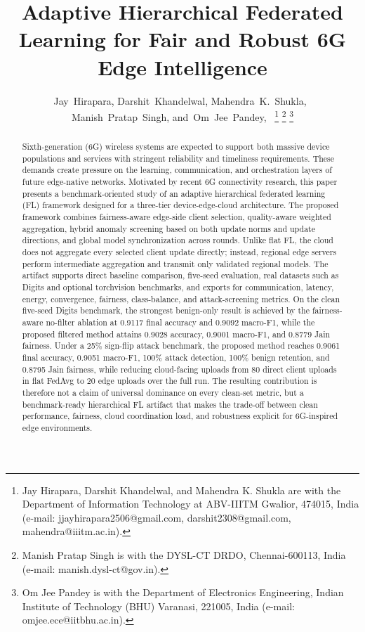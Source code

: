 \documentclass[conference]{IEEEtran}
\begin{document}
\title{Adaptive Hierarchical Federated Learning for Fair and Robust 6G Edge Intelligence}

\author{Jay~Hirapara,
        Darshit~Khandelwal,
        Mahendra~K.~Shukla,~
        Manish~Pratap~Singh,
        and~Om~Jee~Pandey,~%
\thanks{Jay Hirapara, Darshit Khandelwal, and Mahendra K. Shukla are with the Department of Information Technology at ABV-IIITM Gwalior, 474015, India (e-mail: jjayhirapara2506@gmail.com, darshit2308@gmail.com, mahendra@iiitm.ac.in).}%
\thanks{Manish Pratap Singh is with the DYSL-CT DRDO, Chennai-600113, India (e-mail: manish.dysl-ct@gov.in).}%
\thanks{Om Jee Pandey is with the Department of Electronics Engineering, Indian Institute of Technology (BHU) Varanasi, 221005, India (e-mail: omjee.ece@iitbhu.ac.in).}%
}

\maketitle

\begin{abstract}
Sixth-generation (6G) wireless systems are expected to support both massive device populations and services with stringent reliability and timeliness requirements. These demands create pressure on the learning, communication, and orchestration layers of future edge-native networks. Motivated by recent 6G connectivity research, this paper presents a benchmark-oriented study of an adaptive hierarchical federated learning (FL) framework designed for a three-tier device-edge-cloud architecture. The proposed framework combines fairness-aware edge-side client selection, quality-aware weighted aggregation, hybrid anomaly screening based on both update norms and update directions, and global model synchronization across rounds. Unlike flat FL, the cloud does not aggregate every selected client update directly; instead, regional edge servers perform intermediate aggregation and transmit only validated regional models. The artifact supports direct baseline comparison, five-seed evaluation, real datasets such as Digits and optional torchvision benchmarks, and exports for communication, latency, energy, convergence, fairness, class-balance, and attack-screening metrics. On the clean five-seed Digits benchmark, the strongest benign-only result is achieved by the fairness-aware no-filter ablation at 0.9117 final accuracy and 0.9092 macro-F1, while the proposed filtered method attains 0.9028 accuracy, 0.9001 macro-F1, and 0.8779 Jain fairness. Under a 25\% sign-flip attack benchmark, the proposed method reaches 0.9061 final accuracy, 0.9051 macro-F1, 100\% attack detection, 100\% benign retention, and 0.8795 Jain fairness, while reducing cloud-facing uploads from 80 direct client uploads in flat FedAvg to 20 edge uploads over the full run. The resulting contribution is therefore not a claim of universal dominance on every clean-set metric, but a benchmark-ready hierarchical FL artifact that makes the trade-off between clean performance, fairness, cloud coordination load, and robustness explicit for 6G-inspired edge environments.
\end{abstract}
\end{document}
